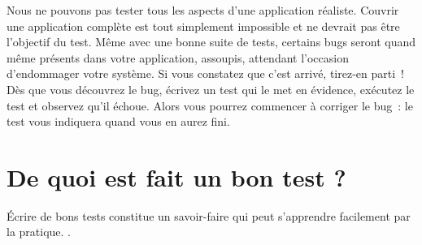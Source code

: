 \documentclass[a4paper,10pt,twoside]{book}
\begin{document}

Nous ne pouvons pas tester tous les aspects d'une application réaliste. Couvrir une application complète est tout simplement impossible et ne devrait pas être l'objectif du test. Même avec une bonne suite de tests, certains bugs seront quand même présents dans votre application, assoupis, attendant l'occasion d'endommager votre système. Si vous constatez que c'est arrivé, tirez-en parti~! Dès que vous découvrez le bug, écrivez un test qui le met en évidence, exécutez le test et observez qu'il échoue. Alors vous pourrez commencer à corriger le bug~: le test vous indiquera quand vous en aurez fini.

\section{De quoi est fait un bon test ?}

\'Ecrire de bons tests constitue un savoir-faire qui peut s'apprendre facilement par la pratique.
.
 
\end{document}
